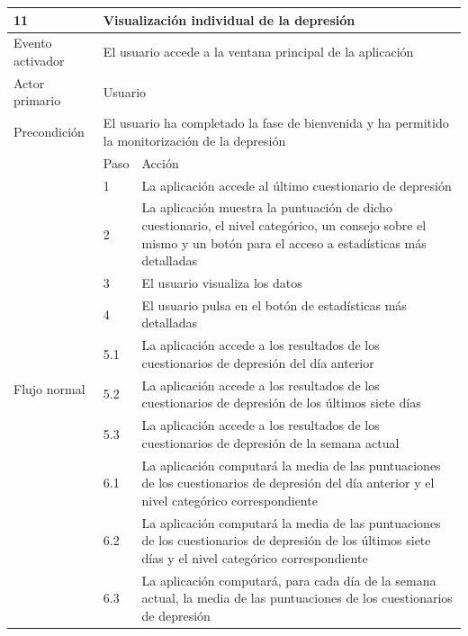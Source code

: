     \begin{table}[h]
        \centering
        \begin{tabularx}{\textwidth}{|l|l|X|}
            \hline
            11 & \multicolumn{2}{|X|}{Visualización individual de la depresión} \\
            \hline
            Evento activador & \multicolumn{2}{|X|}{El usuario accede a la ventana principal de la aplicación} \\
            \hline
            Actor primario & \multicolumn{2}{|X|}{Usuario} \\
            \hline
            Precondición & \multicolumn{2}{|X|}{El usuario ha completado la fase de bienvenida y ha permitido la monitorización de la depresión} \\
            \hline
            \multirow{13}{*}{Flujo normal} & Paso & Acción \\
            \cline{2-3} & 1 & La aplicación accede al último cuestionario de depresión \\
            \cline{2-3} & 2 & La aplicación muestra la puntuación de dicho cuestionario, el nivel categórico, un consejo sobre el mismo y un botón para el acceso a estadísticas más detalladas \\
            \cline{2-3} & 3 & El usuario visualiza los datos \\
            \cline{2-3} & 4 & El usuario pulsa en el botón de estadísticas más detalladas \\
            \cline{2-3} & 5.1 & La aplicación accede a los resultados de los cuestionarios de depresión del día anterior \\
            \cline{2-3} & 5.2 & La aplicación accede a los resultados de los cuestionarios de depresión de los últimos siete días \\
            \cline{2-3} & 5.3 & La aplicación accede a los resultados de los cuestionarios de depresión de la semana actual \\
            \cline{2-3} & 6.1 & La aplicación computará la media de las puntuaciones de los cuestionarios de depresión del día anterior y el nivel categórico correspondiente \\
            \cline{2-3} & 6.2 & La aplicación computará la media de las puntuaciones de los cuestionarios de depresión de los últimos siete días y el nivel categórico correspondiente \\
            \cline{2-3} & 6.3 & La aplicación computará, para cada día de la semana actual, la media de las puntuaciones de los cuestionarios de depresión \\

\end{tabularx}
\end{table}
